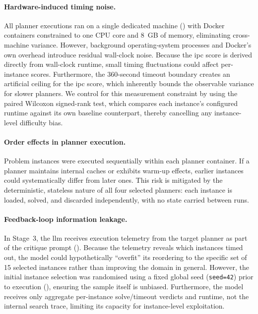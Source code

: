 \paragraph{Hardware-induced timing noise.}
All planner executions ran on a single dedicated machine () with Docker containers constrained to one CPU core and 8~GB of memory, eliminating cross-machine variance.
However, background operating-system processes and Docker's own overhead introduce residual wall-clock noise.
Because the \gls{ipc} score is derived directly from wall-clock runtime, small timing fluctuations could affect per-instance scores.
Furthermore, the 360-second timeout boundary creates an artificial ceiling for the \gls{ipc} score, which inherently bounds the observable variance for slower planners.
We control for this measurement constraint by using the paired Wilcoxon signed-rank test, which compares each instance's configured runtime against its own baseline counterpart, thereby cancelling any instance-level difficulty bias.

\paragraph{Order effects in planner execution.}
Problem instances were executed sequentially within each planner container.
If a planner maintains internal caches or exhibits warm-up effects, earlier instances could systematically differ from later ones.
This risk is mitigated by the deterministic, stateless nature of all four selected planners: each instance is loaded, solved, and discarded independently, with no state carried between runs.

\paragraph{Feedback-loop information leakage.}
In Stage~3, the \gls{llm} receives execution telemetry from the target planner as part of the critique prompt ().
Because the telemetry reveals which instances timed out, the model could hypothetically ``overfit'' its reordering to the specific set of 15 selected instances rather than improving the domain in general.
However, the initial instance selection was randomised using a fixed global seed (\texttt{seed=42}) prior to execution (), ensuring the sample itself is unbiased.
Furthermore, the model receives only aggregate per-instance solve/timeout verdicts and runtime, not the internal search trace, limiting its capacity for instance-level exploitation.

